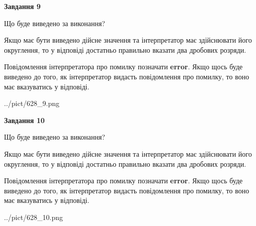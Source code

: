 \documentclass[12pt, ukrainian]{article}
\begin{document}
{\begin {Large}
{\begin {center}\textbf{Завдання 9}\end {center}}\par
Що буде виведено за виконання? \par

Якщо має бути виведено дійсне значення та інтерпретатор має здійснювати його округлення, 
то у відповіді достатньо правильно вказати два дробових розряди.

Повідомлення інтерпретатора про помилку позначати \textbf{error}.
Якщо щось буде виведено до того, як інтерпретатор видасть повідомлення про помилку, 
то воно має вказуватись у відповіді. \par

\begin{center}
	{../pict/628_9.png}
\end{center}
\newpage

{\begin {center}\textbf{Завдання 10}\end {center}}\par
Що буде виведено за виконання? \par

Якщо має бути виведено дійсне значення та інтерпретатор має здійснювати його округлення, 
то у відповіді достатньо правильно вказати два дробових розряди.

Повідомлення інтерпретатора про помилку позначати \textbf{error}.
Якщо щось буде виведено до того, як інтерпретатор видасть повідомлення про помилку, 
то воно має вказуватись у відповіді. \par

\begin{center}
	{../pict/628_10.png}
\end{center}
\newpage

\end {Large}}
\end{document}
